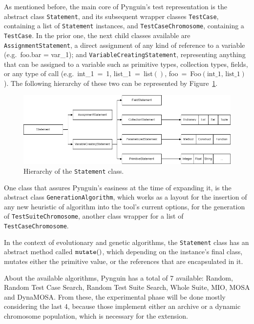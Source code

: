 \documentclass[%
  chapterprefix=false,%
  open=right,%
  twoside=true,%
  paper=a4,%
  logofile={Figures/logo.png},%
  thesistype=master,%
  UKenglish,%
]{se2thesis}
\newcommand{\classname}[1]{\texttt{#1}}
\newcommand{\callable}[1]{\texttt{#1}}
\begin{document}
As mentioned before, the main core of Pynguin's test representation is the abstract class \classname{Statement}, and its subsequent wrapper classes \classname{TestCase}, containing a list of \classname{Statement} instances, and \classname{TestCaseChromosome}, containing a \classname{TestCase}.
In the prior one, the next child classes available are \classname{AssignmentStatement}, a direct assignment of any kind of reference to a variable (e.g.~foo.bar = var\_1); and \classname{VariableCreatingStatement}, representing anything that can be assigned to a variable such as primitive types, collection types, fields, or any type of call (e.g.~int\_1~=~1, list\_1~=~list\(()\), foo~=~Foo\((\text{int\_1,~list\_1})\)).
The following hierarchy of these two can be represented by Figure~\ref{fig:hierarchy}.

\begin{figure}[h]\label{fig:hierarchy}
  \centering
  \includegraphics[width=1\textwidth]{Figures/statement_hierarchy2.png}
  \vspace*{0.5cm}
  \caption{Hierarchy of the \classname{Statement} class.}
\end{figure}

One class that assures Pynguin's easiness at the time of expanding it, is the abstract class \classname{GenerationAlgorithm}, which works as a layout for the insertion of any new heuristic of algorithm into the tool's current options, for the generation of \classname{TestSuiteChromosome}, another class wrapper for a list of \classname{TestCaseChromosome}.

In the context of evolutionary and genetic algorithms, the \classname{Statement} class has an abstract method called \(\text{\callable{mutate}}()\), which depending on the instance's final class, mutates either the primitive value, or the references that are encapsulated in it.

About the available algorithms, Pynguin has a total of 7 available: Random, Random Test Case Search, Random Test Suite Search, Whole Suite, MIO, MOSA and DynaMOSA.\@
From these, the experimental phase will be done mostly considering the last 4, because those implement either an archive or a dynamic chromosome population, which is necessary for the extension.
\end{document}
